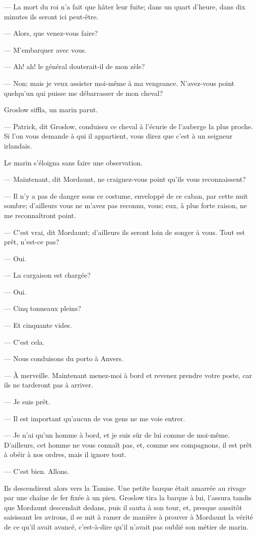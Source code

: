 — La mort du roi n'a fait que hâter leur fuite; dans un quart d'heure, dans dix minutes ils seront ici peut-être.

— Alors, que venez-vous faire?

— M'embarquer avec vous.

— Ah! ah! le général douterait-il de mon zèle?

— Non; mais je veux assister moi-même à ma vengeance. N'avez-vous point quelqu'un qui puisse me débarrasser de mon cheval?

Groslow siffla, un marin parut.

— Patrick, dit Groslow, conduisez ce cheval à l'écurie de l'auberge la plus proche. Si l'on vous demande à qui il appartient, vous direz que c'est à un seigneur irlandais.

Le marin s'éloigna sans faire une observation.

— Maintenant, dit Mordaunt, ne craignez-vous point qu'ils vous reconnaissent?

— Il n'y a pas de danger sous ce costume, enveloppé de ce caban, par cette nuit sombre; d'ailleurs vous ne m'avez pas reconnu, vous; eux, à plus forte raison, ne me reconnaîtront point.

— C'est vrai, dit Mordaunt; d'ailleurs ils seront loin de songer à vous. Tout est prêt, n'est-ce pas?

— Oui.

— La cargaison est chargée?

— Oui.

— Cinq tonneaux pleins?

— Et cinquante vides.

— C'est cela.

— Nous conduisons du porto à Anvers.

— À merveille. Maintenant menez-moi à bord et revenez prendre votre poste, car ils ne tarderont pas à arriver.

— Je suis prêt.

— Il est important qu'aucun de vos gens ne me voie entrer.

— Je n'ai qu'un homme à bord, et je suis sûr de lui comme de moi-même. D'ailleurs, cet homme ne vous connaît pas, et, comme ses compagnons, il est prêt à obéir à nos ordres, mais il ignore tout.

— C'est bien. Allons.

Ils descendirent alors vers la Tamise. Une petite barque était amarrée au rivage par une chaîne de fer fixée à un pieu. Groslow tira la barque à lui, l'assura tandis que Mordaunt descendait dedans, puis il sauta à son tour, et, presque aussitôt saisissant les avirons, il se mit à ramer de manière à prouver à Mordaunt la vérité de ce qu'il avait avancé, c'est-à-dire qu'il n'avait pas oublié son métier de marin.

